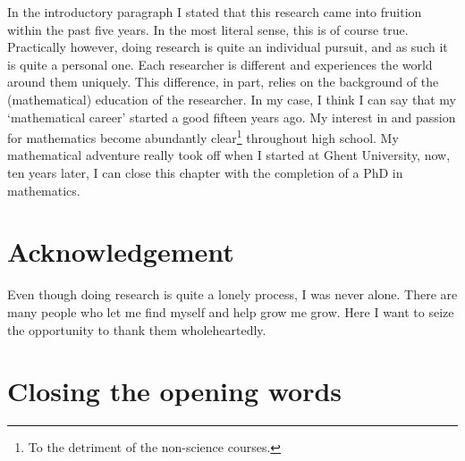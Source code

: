 In the introductory paragraph I stated that this research came into fruition within the past five years. In the most literal sense, this is of course true. Practically however, doing research is quite an individual pursuit, and as such it is quite a personal one. Each researcher is different and experiences the world around them uniquely. This difference, in part, relies on the background of the (mathematical) education of the researcher. In my case, I think I can say that my `mathematical career' started a good fifteen years ago. My interest in and passion for mathematics become abundantly clear\footnote{To the detriment of the non-science courses.} throughout high school. My mathematical adventure really took off when I started at Ghent University, now, ten years later, I can close this chapter with the completion of a PhD in mathematics.


\section*{Acknowledgement}

Even though doing research is quite a lonely process, I was never alone. There are many people who let me find myself and help grow me grow. Here I want to seize the opportunity to thank them wholeheartedly.








\section*{Closing the opening words}


